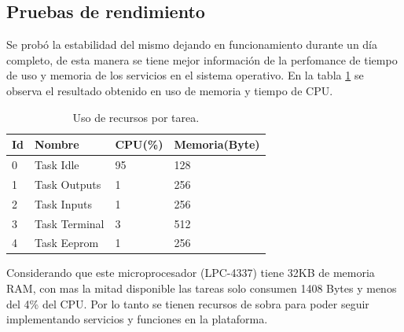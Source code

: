  
\subsection{ Pruebas de rendimiento }

Se probó la estabilidad del mismo dejando en funcionamiento durante un día completo, de esta manera se tiene mejor información de la perfomance de tiempo de uso y memoria de los servicios en el sistema operativo. En la tabla \ref{tabla_rendimiento} se observa el resultado obtenido en uso de memoria y tiempo de CPU.

\begin{table}[h!]
\centering
\begin{tabular}{ m{1.0cm}|m{3.0cm}|m{2.0cm}|m{2.5cm} }\hline
{\textbf{Id}} &{\textbf{Nombre}} & {\textbf{CPU(\%)}} & {\textbf{Memoria(Byte)}}\\ \hline
{0} & {Task Idle} & { 95 } & { 128 }\\ \hline
{1} & {Task Outputs} & { 1 } & { 256 }\\ \hline
{2} & {Task Inputs}  & { 1 } & { 256 }\\ \hline
{3} & {Task Terminal} & { 3 } & { 512 }\\ \hline
{4} & {Task Eeprom } & { 1 } & { 256 }\\ \hline
\end{tabular}
\caption{Uso de recursos por tarea.}
\label{tabla_rendimiento}
\end{table}

Considerando que este microprocesador (LPC-4337) tiene 32KB de memoria RAM, con mas la mitad disponible las tareas solo consumen 1408 Bytes y menos del 4\% del CPU. Por lo tanto se tienen recursos de sobra para poder seguir implementando servicios y funciones en la plataforma.
